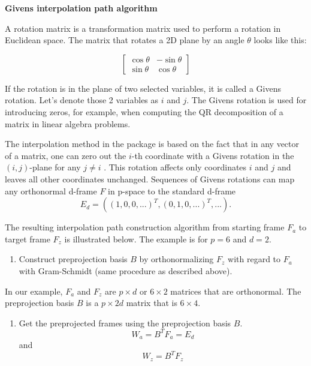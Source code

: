 \textbf{Givens interpolation path algorithm}

A rotation matrix is a transformation matrix used to perform a rotation in Euclidean space. The matrix that rotates a 2D plane by an angle \(\theta\) looks like this:

\[ \begin{bmatrix}\cos \theta &-\sin \theta \\\sin \theta &\cos \theta \end{bmatrix} \]

If the rotation is in the plane of two selected variables, it is called a Givens rotation. Let's denote those 2 variables as \(i\) and \(j\). The Givens rotation is used for introducing zeros, for example, when computing the QR decomposition of a matrix in linear algebra problems.

The interpolation method in the  package is based on the fact that in any vector of a matrix, one can zero out the \(i\)-th coordinate with a Givens rotation in the \((i, j)\)-plane for any \(j\neq i\) \citep{matrix_computation}. This rotation affects only coordinates \(i\) and \(j\) and leaves all other coordinates unchanged.
Sequences of Givens rotations can map any orthonormal d-frame \(F\) in p-space to the standard d-frame
\[E_d=((1, 0, 0, ...)^T, (0, 1, 0, ...)^T, ...).\]

The resulting interpolation path construction algorithm from starting frame \(F_a\) to target frame \(F_z\) is illustrated below. The example is for \(p=6\) and \(d=2\).

\begin{enumerate}
\def\labelenumi{\arabic{enumi}.}
\tightlist
\item
  Construct preprojection basis \(B\) by orthonormalizing \(F_z\) with regard to \(F_a\) with Gram-Schmidt (same procedure as described above).
\end{enumerate}

In our example, \(F_a\) and \(F_z\) are \(p\times d\) or \(6\times2\) matrices that are orthonormal. The preprojection basis \(B\) is a \(p\times 2d\) matrix that is \(6\times 4\).

\begin{enumerate}
\def\labelenumi{\arabic{enumi}.}
\setcounter{enumi}{1}
\tightlist
\item
  Get the preprojected frames using the preprojection basis \(B\).
  \[W_a = B^TF_a = E_d\] and \[W_z = B^TF_z\]
\end{enumerate}

